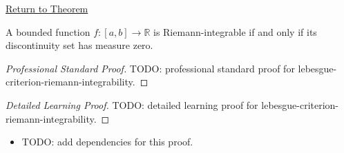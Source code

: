 \newpage
{}
\label{prf:lebesgue-criterion-riemann-integrability}
\begin{remark*}[Return]\hyperref[thm:lebesgue-criterion-riemann-integrability]{Return to Theorem}\end{remark*}

\begin{theorem*}
A bounded function \(f:[a,b]\to\mathbb R\) is Riemann-integrable if and only
if its discontinuity set has measure zero.
\end{theorem*}

\begin{proof}[Professional Standard Proof]
\LRAProofBodyStart
TODO: professional standard proof for lebesgue-criterion-riemann-integrability.
\end{proof}

\begin{proof}[Detailed Learning Proof]
\LRAProofBodyStart
TODO: detailed learning proof for lebesgue-criterion-riemann-integrability.
\end{proof}

\begin{remark*}
\end{remark*}

\begin{dependencies}
\begin{itemize}
  \item TODO: add dependencies for this proof.
\end{itemize}
\end{dependencies}

\clearpage
